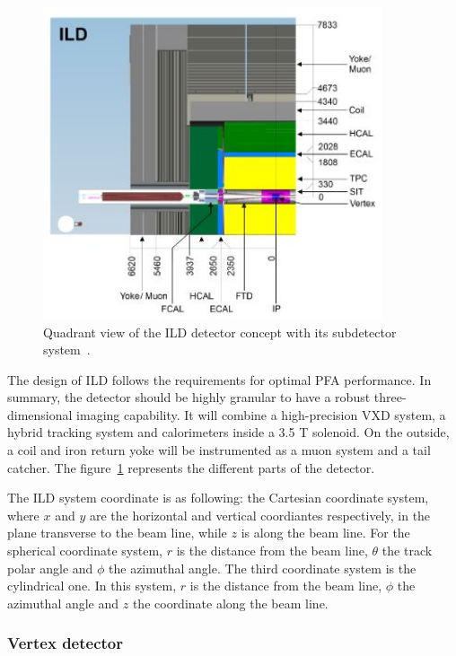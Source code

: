     \begin{figure}[!h]
      \centering
      \includegraphics[width = 10cm]{Pictures/ILC/fig_ILD_Quadrant.png}
      \caption{Quadrant view of the ILD detector concept with its subdetector system~\cite{Behnke2010}.}
      \label{fig:ILD_quadrant}
    \end{figure}

    The design of \gls{ILD} follows the requirements for optimal \gls{PFA} performance.
    In summary, the detector should be highly granular to have a robust three-dimensional imaging capability.
    It will combine a high-precision \acrfull{VXD} system, a hybrid tracking system and calorimeters inside a 3.5 T solenoid. 
    On the outside, a coil and iron return yoke will be instrumented as a muon system and a tail catcher.
    The figure~\ref{fig:ILD_quadrant} represents the different parts of the detector.

    The \gls{ILD} system coordinate is as following: the Cartesian coordinate system, where $x$ and $y$ are the horizontal and vertical coordiantes respectively, in the plane transverse to the beam line, while $z$ is along the beam line.
    For the spherical coordinate system, $r$ is the distance from the beam line, $\theta$ the track polar angle and $\phi$ the azimuthal angle.
    The third coordinate system is the cylindrical one.
    In this system, $r$ is the distance from the beam line, $\phi$ the azimuthal angle and $z$ the coordinate along the beam line.

      \subsubsection{Vertex detector}

